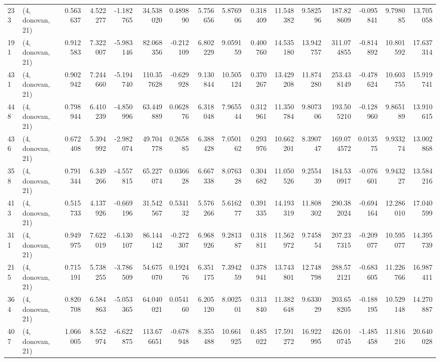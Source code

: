 \begin{tabular}{llrrrrrrrrrrrrrr}
233 &  (4, donovan, 21) &   0.563637 &   4.522277 &  -1.182765 &    34.538020 &   0.489890 &   5.756656 &   5.876906 &  0.318409 &  11.548382 &   9.582596 &   187.828609 & -0.095841 &   9.798085 &  13.705058 \\
191 &  (4, donovan, 21) &   0.912583 &   7.322007 &  -5.983146 &    82.068356 &  -0.212109 &   6.802229 &   9.059159 &  0.400760 &  14.535180 &  13.942757 &   311.074855 & -0.814892 &  10.801592 &  17.637314 \\
431 &  (4, donovan, 21) &   0.902942 &   7.244660 &  -5.194740 &   110.357628 &  -0.629928 &   9.130844 &  10.505124 &  0.370267 &  13.429208 &  11.874280 &   253.438149 & -0.478624 &  10.603755 &  15.919741 \\
448 &  (4, donovan, 21) &   0.798944 &   6.410239 &  -4.850996 &    63.449889 &   0.062876 &   6.318048 &   7.965544 &  0.312961 &  11.350784 &   9.807306 &   193.505210 & -0.128960 &   9.865189 &  13.910615 \\
436 &  (4, donovan, 21) &   0.672408 &   5.394992 &  -2.982074 &    49.704778 &   0.265885 &   6.388428 &   7.050162 &  0.293976 &  10.662201 &   8.390747 &   169.074572 &  0.013575 &   9.933274 &  13.002868 \\
358 &  (4, donovan, 21) &   0.791344 &   6.349266 &  -4.557815 &    65.227074 &   0.036628 &   6.667338 &   8.076328 &  0.304682 &  11.050526 &   9.255439 &   184.530917 & -0.076601 &   9.943227 &  13.584216 \\
413 &  (4, donovan, 21) &   0.515733 &   4.137926 &  -0.669196 &    31.542567 &   0.534132 &   5.576266 &   5.616277 &  0.391335 &  14.193319 &  11.808302 &   290.382024 & -0.694164 &  12.286010 &  17.040599 \\
311 &  (4, donovan, 21) &   0.949975 &   7.622019 &  -6.130107 &    86.144142 &  -0.272307 &   6.968926 &   9.281387 &  0.318811 &  11.562972 &   9.745854 &   207.237315 & -0.209077 &  10.595077 &  14.395739 \\
215 &  (4, donovan, 21) &   0.715191 &   5.738255 &  -3.786509 &    54.675070 &   0.192476 &   6.351175 &   7.394259 &  0.378941 &  13.743801 &  12.748798 &   288.572121 & -0.683605 &  11.226766 &  16.987411 \\
364 &  (4, donovan, 21) &   0.820708 &   6.584863 &  -5.053365 &    64.040021 &   0.054160 &   6.205120 &   8.002501 &  0.313840 &  11.382648 &   9.633029 &   203.658205 & -0.188195 &  10.529148 &  14.270887 \\
407 &  (4, donovan, 21) &   1.066005 &   8.552974 &  -6.622875 &   113.676651 &  -0.678948 &   8.355488 &  10.661925 &  0.485022 &  17.591272 &  16.922995 &   426.010745 & -1.485458 &  11.816216 &  20.640028 \\

\end{tabular}
